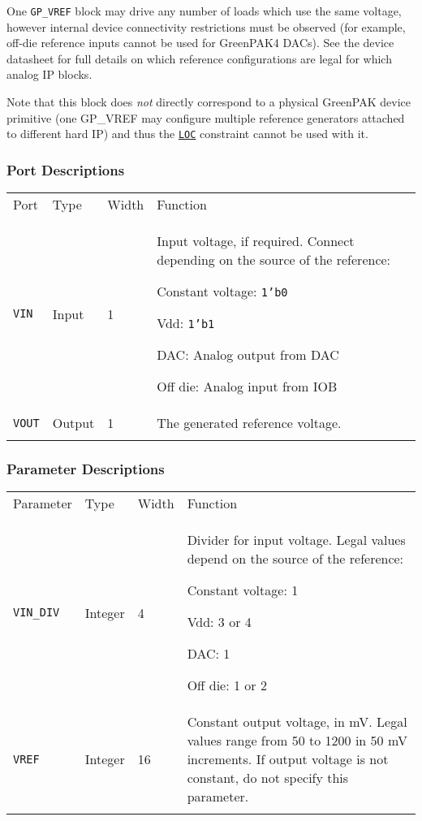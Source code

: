\documentclass[11pt]{article}
\newcommand{\tokenstyle}[1]{\texttt{#1}}
\newcommand{\datastyle}[1]{\texttt{#1}}
\newcommand{\whenstyle}[1]{{\fontseries{sb}\selectfont#1}}
\newcommand{\tokenref}[2]{\hyperref[#2]{\tokenstyle{#1}}}
\newcommand{\thinhline}{\Xhline{1\arrayrulewidth}}
\newcommand{\thickhline}{\Xhline{2.5\arrayrulewidth}}
\newcommand{\novspace}{\vspace*{-\baselineskip}}
\begin{document}
One \tokenstyle{GP\_VREF} block may drive any number of loads which use the same voltage, however internal device
connectivity restrictions must be observed (for example, off-die reference inputs cannot be used for GreenPAK4 DACs).
See the device datasheet for full details on which reference configurations are legal for which analog IP blocks.

Note that this block does \textit{not} directly correspond to a physical GreenPAK device primitive (one GP\_VREF may
configure multiple reference generators attached to different hard IP) and thus the \tokenref{LOC}{constraint-loc}
constraint cannot be used with it.

\subsubsection{Port Descriptions}

\begin{tabularx}{\textwidth}{lllX}
\thinhline
\whenstyle{Port} & \whenstyle{Type} & \whenstyle{Width} & \whenstyle{Function} \\
\thickhline
\tokenstyle{VIN} & Input & 1 & Input voltage, if required. Connect depending on the source of the reference:
	\begin{compactitem}
		\item Constant voltage: \datastyle{1'b0}
		\item Vdd: \datastyle{1'b1}
		\item DAC: Analog output from DAC
		\item Off die: Analog input from IOB\novspace
	\end{compactitem}
\\
\thinhline
\tokenstyle{VOUT} & Output & 1 & The generated reference voltage. \\
\thinhline
\end{tabularx}

\subsubsection{Parameter Descriptions}

\begin{tabularx}{\textwidth}{lllX}
\thinhline
\whenstyle{Parameter} & \whenstyle{Type} & \whenstyle{Width} & \whenstyle{Function} \\
\thickhline
\tokenstyle{VIN\_DIV} & Integer & 4 &
	Divider for input voltage. Legal values depend on the source of the reference:
	\begin{compactitem}
		\item Constant voltage: 1
		\item Vdd: 3 or 4
		\item DAC: 1
		\item Off die: 1 or 2\novspace
	\end{compactitem}
\\
\thinhline
\tokenstyle{VREF} & Integer & 16 &
	Constant output voltage, in mV. Legal values range from 50 to 1200 in 50 mV increments.
	If output voltage is not constant, do not specify this parameter.\\
\thinhline
\end{tabularx}
\end{document}
